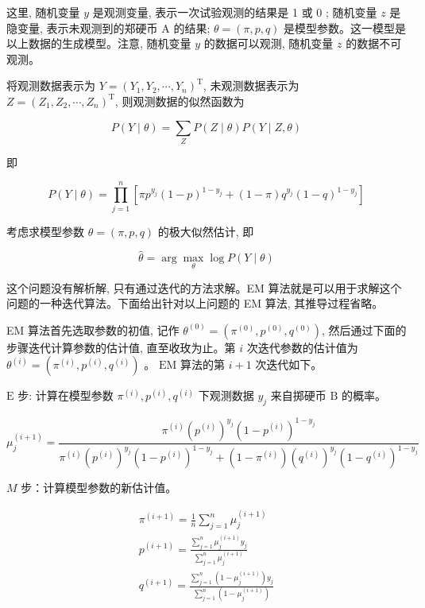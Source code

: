 \documentclass[10pt]{article}
\begin{document}
这里, 随机变量 $y$ 是观测变量, 表示一次试验观测的结果是 1 或 0 ; 随机变量 $z$ 是隐变量, 表示未观测到的郑硬币 $\mathrm{A}$ 的结果; $\theta=(\pi, p, q)$ 是模型参数。这一模型是以上数据的生成模型。注意, 随机变量 $y$ 的数据可以观测, 随机变量 $z$ 的数据不可观测。

将观测数据表示为 $Y=\left(Y_{1}, Y_{2}, \cdots, Y_{n}\right)^{\mathrm{T}}$, 未观测数据表示为 $Z=\left(Z_{1}, Z_{2}, \cdots, Z_{n}\right)^{\mathrm{T}}$, 则观测数据的似然函数为


\begin{equation*}
P(Y \mid \theta)=\sum_{Z} P(Z \mid \theta) P(Y \mid Z, \theta) \tag{9.2}
\end{equation*}


即


\begin{equation*}
P(Y \mid \theta)=\prod_{j=1}^{n}\left[\pi p^{y_{j}}(1-p)^{1-y_{j}}+(1-\pi) q^{y_{j}}(1-q)^{1-y_{j}}\right] \tag{9.3}
\end{equation*}


考虑求模型参数 $\theta=(\pi, p, q)$ 的极大似然估计, 即


\begin{equation*}
\hat{\theta}=\arg \max _{\theta} \log P(Y \mid \theta) \tag{9.4}
\end{equation*}


这个问题没有解析解, 只有通过迭代的方法求解。EM 算法就是可以用于求解这个问题的一种迭代算法。下面给出针对以上问题的 EM 算法, 其推导过程省略。

EM 算法首先选取参数的初值, 记作 $\theta^{(0)}=\left(\pi^{(0)}, p^{(0)}, q^{(0)}\right)$, 然后通过下面的步骤迭代计算参数的估计值, 直至收玫为止。第 $i$ 次迭代参数的估计值为 $\theta^{(i)}=\left(\pi^{(i)}, p^{(i)}, q^{(i)}\right)$ 。 $\mathrm{EM}$ 算法的第 $i+1$ 次迭代如下。

$\mathrm{E}$ 步: 计算在模型参数 $\pi^{(i)}, p^{(i)}, q^{(i)}$ 下观测数据 $y_{j}$ 来自掷硬币 $\mathrm{B}$ 的概率。


\begin{equation*}
\mu_{j}^{(i+1)}=\frac{\pi^{(i)}\left(p^{(i)}\right)^{y_{j}}\left(1-p^{(i)}\right)^{1-y_{j}}}{\pi^{(i)}\left(p^{(i)}\right)^{y_{j}}\left(1-p^{(i)}\right)^{1-y_{j}}+\left(1-\pi^{(i)}\right)\left(q^{(i)}\right)^{y_{j}}\left(1-q^{(i)}\right)^{1-y_{j}}} \tag{9.5}
\end{equation*}


$M$ 步：计算模型参数的新估计值。

\[
\begin{array}{r}
\pi^{(i+1)}=\frac{1}{n} \sum_{j=1}^{n} \mu_{j}^{(i+1)} \\
p^{(i+1)}=\frac{\sum_{j=1}^{n} \mu_{j}^{(i+1)} y_{j}}{\sum_{j=1}^{n} \mu_{j}^{(i+1)}} \\
q^{(i+1)}=\frac{\sum_{j=1}^{n}\left(1-\mu_{j}^{(i+1)}\right) y_{j}}{\sum_{j=1}^{n}\left(1-\mu_{j}^{(i+1)}\right)} \tag{9.8}
\end{array}
\]
\end{document}

